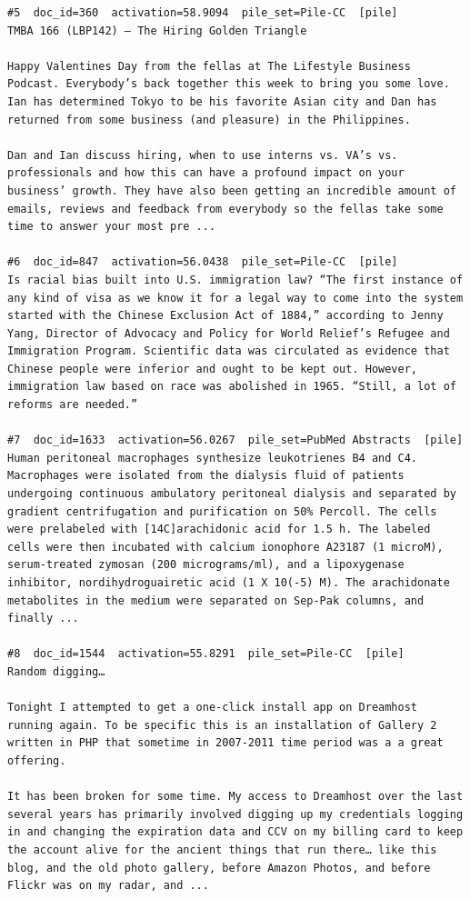 \begin{verbatim}
#5  doc_id=360  activation=58.9094  pile_set=Pile-CC  [pile]
TMBA 166 (LBP142) – The Hiring Golden Triangle

Happy Valentines Day from the fellas at The Lifestyle Business Podcast. Everybody’s back together this week to bring you some love. Ian has determined Tokyo to be his favorite Asian city and Dan has returned from some business (and pleasure) in the Philippines.

Dan and Ian discuss hiring, when to use interns vs. VA’s vs. professionals and how this can have a profound impact on your business’ growth. They have also been getting an incredible amount of emails, reviews and feedback from everybody so the fellas take some time to answer your most pre ...

#6  doc_id=847  activation=56.0438  pile_set=Pile-CC  [pile]
Is racial bias built into U.S. immigration law? “The first instance of any kind of visa as we know it for a legal way to come into the system started with the Chinese Exclusion Act of 1884,” according to Jenny Yang, Director of Advocacy and Policy for World Relief’s Refugee and Immigration Program. Scientific data was circulated as evidence that Chinese people were inferior and ought to be kept out. However, immigration law based on race was abolished in 1965. “Still, a lot of reforms are needed.”

#7  doc_id=1633  activation=56.0267  pile_set=PubMed Abstracts  [pile]
Human peritoneal macrophages synthesize leukotrienes B4 and C4.
Macrophages were isolated from the dialysis fluid of patients undergoing continuous ambulatory peritoneal dialysis and separated by gradient centrifugation and purification on 50% Percoll. The cells were prelabeled with [14C]arachidonic acid for 1.5 h. The labeled cells were then incubated with calcium ionophore A23187 (1 microM), serum-treated zymosan (200 micrograms/ml), and a lipoxygenase inhibitor, nordihydroguairetic acid (1 X 10(-5) M). The arachidonate metabolites in the medium were separated on Sep-Pak columns, and finally ...

#8  doc_id=1544  activation=55.8291  pile_set=Pile-CC  [pile]
Random digging…

Tonight I attempted to get a one-click install app on Dreamhost running again. To be specific this is an installation of Gallery 2 written in PHP that sometime in 2007-2011 time period was a a great offering.

It has been broken for some time. My access to Dreamhost over the last several years has primarily involved digging up my credentials logging in and changing the expiration data and CCV on my billing card to keep the account alive for the ancient things that run there… like this blog, and the old photo gallery, before Amazon Photos, and before Flickr was on my radar, and ...


\end{verbatim}

